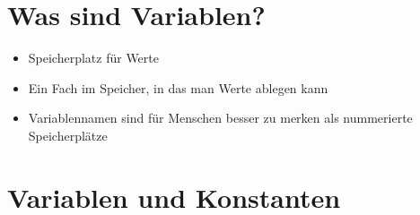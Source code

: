 



\subtitle{Kapitel 3: Daten Zwischenspeichern}
\maketitle

\section{Was sind Variablen?}
\begin{frame}[fragile]
    \slidehead
    \begin{itemize}[<+->]
        \item Speicherplatz für Werte
        \item Ein Fach im Speicher, in das man Werte ablegen kann
        \item Variablennamen sind für Menschen besser zu merken als nummerierte Speicherplätze
    \end{itemize}
\end{frame}

\section{Variablen und Konstanten}
